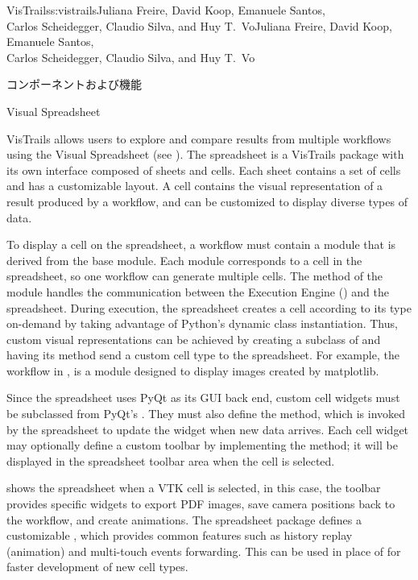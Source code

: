 \begin{aosachaptertoc}{VisTrails}{s:vistrails}{Juliana Freire, David Koop, Emanuele Santos, \\ Carlos Scheidegger, Claudio Silva, and Huy T.\ Vo}{Juliana Freire, David Koop, Emanuele Santos, \\ \hspace*{0.9cm} Carlos Scheidegger, Claudio Silva, and Huy T.\ Vo}
\begin{aosasect1}{コンポーネントおよび機能}

\begin{aosasect2}{Visual Spreadsheet}

VisTrails allows users to explore and compare results from multiple
workflows using the Visual Spreadsheet (see
). The spreadsheet is a
VisTrails package with its own interface composed of sheets and
cells. Each sheet contains a set of cells and has a customizable
layout.  A cell contains the visual representation of a result
produced by a workflow, and can be customized to display diverse types
of data.

To display a cell on the spreadsheet, a workflow must contain a module
that is derived from the base  module.  Each
 module corresponds to a cell in the
spreadsheet, so one workflow can generate multiple cells.  The
 method of the  module handles the
communication between the Execution Engine
() and the spreadsheet.  During
execution, the spreadsheet creates a cell according to its type
on-demand by taking advantage of Python's dynamic class instantiation.
Thus, custom visual representations can be achieved by creating a
subclass of  and having its 
method send a custom cell type to the spreadsheet. For example, the
workflow in , 
is a  module designed to display images created
by matplotlib.

Since the spreadsheet uses PyQt as its GUI back end, custom cell
widgets must be subclassed from PyQt's .  They must also
define the  method, which is invoked by the
spreadsheet to update the widget when new data arrives. Each cell
widget may optionally define a custom toolbar by implementing the
 method; it will be displayed in the spreadsheet
toolbar area when the cell is selected.

 shows the spreadsheet when a
VTK cell is selected, in this case, the toolbar provides specific
widgets to export PDF images, save camera positions back to the
workflow, and create animations.  The spreadsheet package defines a
customizable , which provides common features such
as history replay (animation) and multi-touch events forwarding. This
can be used in place of  for faster development of new
cell types.


\end{aosasect2}
\end{aosasect1}
\end{aosachaptertoc}
